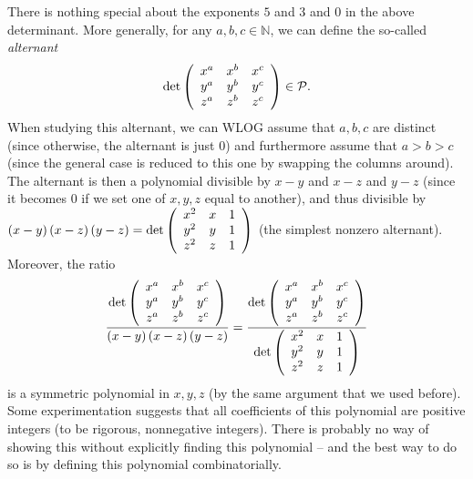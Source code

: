 \begin{example}
There is nothing special about the exponents $5$ and $3$ and $0$ in the above
determinant. More generally, for any $a,b,c\in\mathbb{N}$, we can define the
so-called \emph{alternant}%
\[
\det\left(
\begin{array}
[c]{ccc}%
x^{a} & x^{b} & x^{c}\\
y^{a} & y^{b} & y^{c}\\
z^{a} & z^{b} & z^{c}%
\end{array}
\right)  \in\mathcal{P}.
\]
When studying this alternant, we can WLOG assume that $a,b,c$ are distinct
(since otherwise, the alternant is just $0$) and furthermore assume that
$a>b>c$ (since the general case is reduced to this one by swapping the columns
around). The alternant is then a polynomial divisible by $x-y$ and $x-z$ and
$y-z$ (since it becomes $0$ if we set one of $x,y,z$ equal to another), and
thus divisible by $\left(  x-y\right)  \left(  x-z\right)  \left(  y-z\right)
=\det\left(
\begin{array}
[c]{ccc}%
x^{2} & x & 1\\
y^{2} & y & 1\\
z^{2} & z & 1
\end{array}
\right)  $ (the simplest nonzero alternant). Moreover, the ratio%
\[
\dfrac{\det\left(
\begin{array}
[c]{ccc}%
x^{a} & x^{b} & x^{c}\\
y^{a} & y^{b} & y^{c}\\
z^{a} & z^{b} & z^{c}%
\end{array}
\right)  }{\left(  x-y\right)  \left(  x-z\right)  \left(  y-z\right)
}=\dfrac{\det\left(
\begin{array}
[c]{ccc}%
x^{a} & x^{b} & x^{c}\\
y^{a} & y^{b} & y^{c}\\
z^{a} & z^{b} & z^{c}%
\end{array}
\right)  }{\det\left(
\begin{array}
[c]{ccc}%
x^{2} & x & 1\\
y^{2} & y & 1\\
z^{2} & z & 1
\end{array}
\right)  }%
\]
is a symmetric polynomial in $x,y,z$ (by the same argument that we used
before). Some experimentation suggests that all coefficients of this
polynomial are positive integers (to be rigorous, nonnegative integers). There
is probably no way of showing this without explicitly finding this polynomial
-- and the best way to do so is by defining this polynomial combinatorially.
\end{example}

